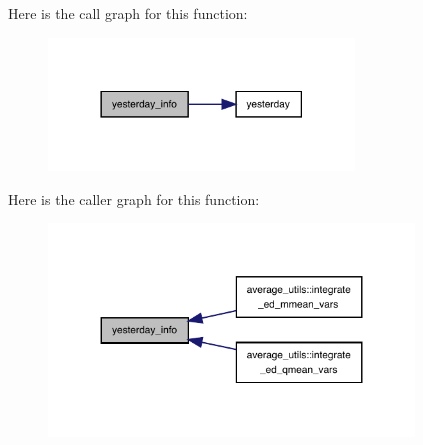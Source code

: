 Here is the call graph for this function\+:
\nopagebreak
\begin{figure}[H]
\begin{center}
\leavevmode
\includegraphics[width=230pt]{invmondays_8f90_ab24cf4964d266158f880214060f2ce53_cgraph}
\end{center}
\end{figure}
Here is the caller graph for this function\+:
\nopagebreak
\begin{figure}[H]
\begin{center}
\leavevmode
\includegraphics[width=275pt]{invmondays_8f90_ab24cf4964d266158f880214060f2ce53_icgraph}
\end{center}
\end{figure}
